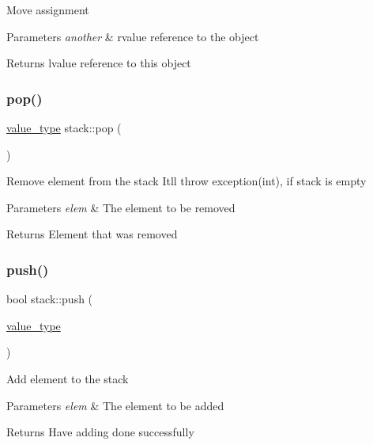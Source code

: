 Move assignment


\begin{DoxyParams}{Parameters}
{\em another} & rvalue reference to the object\\
\hline
\end{DoxyParams}
\begin{DoxyReturn}{Returns}
lvalue reference to this object 
\end{DoxyReturn}
\mbox{\label{classstack_a88f5bbf41acc7d70bbe1dc54ea7097a5}} 
\subsubsection{\texorpdfstring{pop()}{pop()}}
{\footnotesize\ttfamily \hyperlink{classstack_acb2e70c8f4214e9446e9f69f69da8b94}{value\+\_\+type} stack\+::pop (\begin{DoxyParamCaption}{ }\end{DoxyParamCaption})}

Remove element from the stack It\textquotesingle{}ll throw exception(int), if stack is empty


\begin{DoxyParams}{Parameters}
{\em elem} & The element to be removed\\
\hline
\end{DoxyParams}
\begin{DoxyReturn}{Returns}
Element that was removed 
\end{DoxyReturn}
\mbox{\label{classstack_a3d026ffa5b32a0a43d7432e8b0eecfed}} 
\subsubsection{\texorpdfstring{push()}{push()}}
{\footnotesize\ttfamily bool stack\+::push (\begin{DoxyParamCaption}\item[{\hyperlink{classstack_acb2e70c8f4214e9446e9f69f69da8b94}{value\+\_\+type}}]{ }\end{DoxyParamCaption})}

Add element to the stack


\begin{DoxyParams}{Parameters}
{\em elem} & The element to be added\\
\hline
\end{DoxyParams}
\begin{DoxyReturn}{Returns}
Have adding done successfully 
\end{DoxyReturn}
\mbox{\label{classstack_af92cacb24391bd58fc48788afbd375b7}} 
